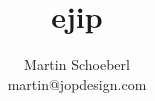 \documentclass[a4paper,12pt]{scrartcl}
\begin{document}
\title{ejip}
\author{Martin Schoeberl\\ martin@jopdesign.com}
\maketitle \thispagestyle{empty}







\end{document}
